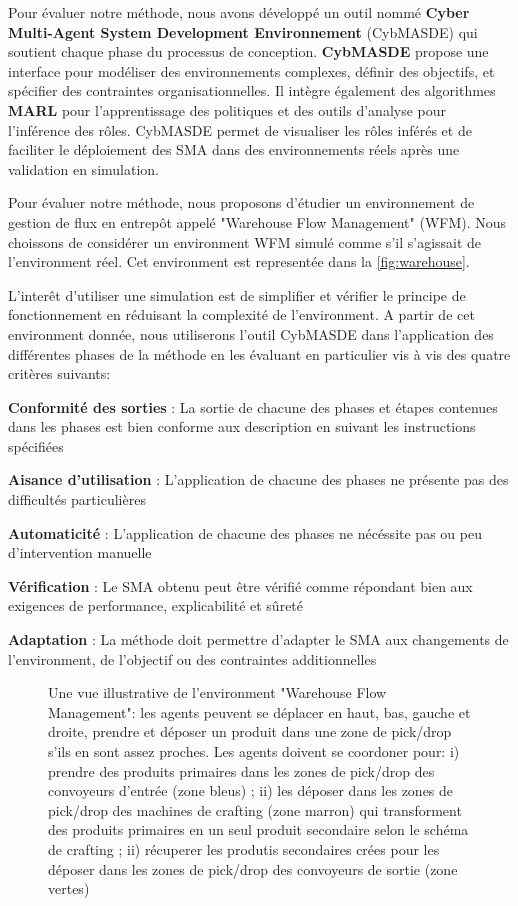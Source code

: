 \documentclass[sigconf,anonymous]{aamas}
\begin{document}
Pour évaluer notre méthode, nous avons développé un outil nommé \textbf{Cyber Multi-Agent System Development Environnement} (CybMASDE) qui soutient chaque phase du processus de conception. \textbf{CybMASDE} propose une interface pour modéliser des environnements complexes, définir des objectifs, et spécifier des contraintes organisationnelles. Il intègre également des algorithmes \textbf{MARL} pour l'apprentissage des politiques et des outils d'analyse pour l'inférence des rôles. CybMASDE permet de visualiser les rôles inférés et de faciliter le déploiement des SMA dans des environnements réels après une validation en simulation.

Pour évaluer notre méthode, nous proposons d'étudier un environnement de gestion de flux en entrepôt appelé "Warehouse Flow Management" (WFM). Nous choissons de considérer un environment WFM simulé comme s'il s'agissait de l'environment réel. Cet environment est representée dans la \autoref{fig:warehouse}.

L'interêt d'utiliser une simulation est de simplifier et vérifier le principe de fonctionnement en réduisant la complexité de l'environment. A partir de cet environment donnée, nous utiliserons l'outil CybMASDE dans l'application des différentes phases de la méthode en les évaluant en particulier vis à vis des quatre critères suivants:

\begin{itemize*}[label={},itemjoin={; }]
  \item \textbf{Conformité des sorties} : La sortie de chacune des phases et étapes contenues dans les phases est bien conforme aux description en suivant les instructions spécifiées
  \item \textbf{Aisance d'utilisation} : L'application de chacune des phases ne présente pas des difficultés particulières
  \item \textbf{Automaticité} : L'application de chacune des phases ne nécéssite pas ou peu d'intervention manuelle
  \item \textbf{Vérification} : Le SMA obtenu peut être vérifié comme répondant bien aux exigences de performance, explicabilité et sûreté
  \item \textbf{Adaptation} : La méthode doit permettre d'adapter le SMA aux changements de l'environment, de l'objectif ou des contraintes additionnelles
\end{itemize*}

\begin{figure*}
  \centering
  
  \caption{Une vue illustrative de l'environment "Warehouse Flow Management": les agents peuvent se déplacer en haut, bas, gauche et droite, prendre et déposer un produit dans une zone de pick/drop s'ils en sont assez proches. Les agents doivent se coordoner pour: i) prendre des produits primaires dans les zones de pick/drop des convoyeurs d'entrée (zone bleus) ; ii) les déposer dans les zones de pick/drop des machines de crafting (zone marron) qui transforment des produits primaires en un seul produit secondaire selon le schéma de crafting ; ii) récuperer les produtis secondaires crées pour les déposer dans les zones de pick/drop des convoyeurs de sortie (zone vertes)}
  \label{fig:warehouse}
\end{figure*}
\end{document}
